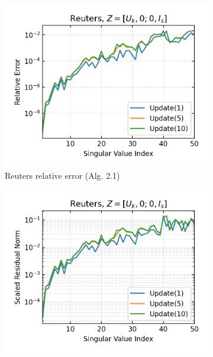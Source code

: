 
\begin{figure}[H]
  \centering
  \begin{subfigure}[b]{0.48\textwidth}
    \centering
    \includegraphics[width=\textwidth]{figures/reuters/Reuters_zha-simon_n_batches_10_k_dims_50_rel_err.png}
    \caption{Reuters relative error (Alg. 2.1)}
  \end{subfigure}
  \hfill
  \begin{subfigure}[b]{0.48\textwidth}
    \centering
    \includegraphics[width=\textwidth]{figures/reuters/Reuters_zha-simon_n_batches_10_k_dims_50_res_norm.png}

\end{subfigure}
\end{figure}
